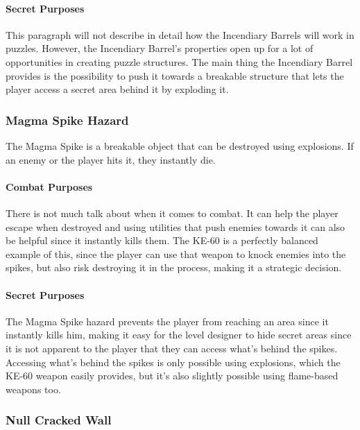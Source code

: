 \documentclass[12pt]{article}
\begin{document}
\paragraph{Secret Purposes}

This paragraph will not describe in detail how the Incendiary Barrels will work in puzzles. However, the Incendiary Barrel's properties open up for a lot of opportunities in creating puzzle structures. The main thing the Incendiary Barrel provides is the possibility to push it towards a breakable structure that lets the player access a secret area behind it by exploding it. 

\subsubsection{Magma Spike Hazard}

The Magma Spike is a breakable object that can be destroyed using explosions. If an enemy or the player hits it, they instantly die. 

\paragraph{Combat Purposes}

There is not much talk about when it comes to combat. It can help the player escape when destroyed and using utilities that push enemies towards it can also be helpful since it instantly kills them. The KE-60 is a perfectly balanced example of this, since the player can use that weapon to knock enemies into the spikes, but also risk destroying it in the process, making it a strategic decision.

\paragraph{Secret Purposes}

The Magma Spike hazard prevents the player from reaching an area since it instantly kills him, making it easy for the level designer to hide secret areas since it is not apparent to the player that they can access what's behind the spikes. Accessing what's behind the spikes is only possible using explosions, which the KE-60 weapon easily provides, but it's also slightly possible using flame-based weapons too. 

\subsubsection{Null Cracked Wall}
\end{document}
